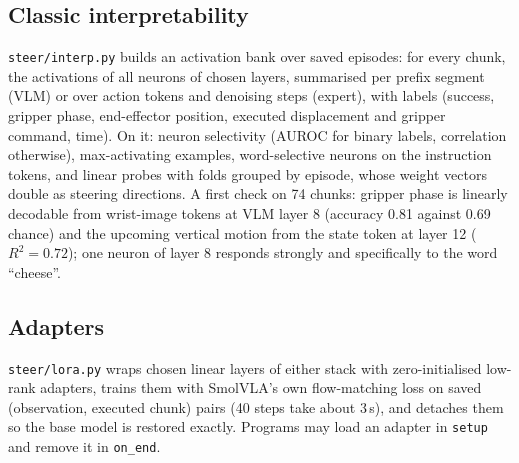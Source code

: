 \documentclass[11pt]{article}
\begin{document}
\subsection{Classic interpretability}
\texttt{steer/interp.py} builds an activation bank over saved episodes: for every chunk, the activations of all neurons of
chosen layers, summarised per prefix segment (VLM) or over action tokens and denoising steps (expert), with labels (success,
gripper phase, end-effector position, executed displacement and gripper command, time). On it: neuron selectivity (AUROC for binary
labels, correlation otherwise), max-activating examples, word-selective neurons on the instruction tokens, and linear probes with
folds grouped by episode, whose weight vectors double as steering directions. A first check on 74 chunks: gripper phase is linearly
decodable from wrist-image tokens at VLM layer 8 (accuracy 0.81 against 0.69 chance) and the upcoming vertical motion from the state
token at layer 12 ($R^2=0.72$); one neuron of layer 8 responds strongly and specifically to the word ``cheese''.

\subsection{Adapters}
\texttt{steer/lora.py} wraps chosen linear layers of either stack with zero-initialised low-rank adapters, trains them with
SmolVLA's own flow-matching loss on saved (observation, executed chunk) pairs (40 steps take about 3\,s), and detaches them so
the base model is restored exactly. Programs may load an adapter in \texttt{setup} and remove it in \texttt{on\_end}.
\end{document}
